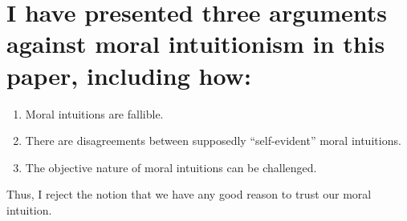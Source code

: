 \documentclass[12pt, a4paper, twoside]{article}
\begin{document}
\section{I have presented three arguments against moral intuitionism in this paper, including how: }

\begin{enumerate}
\item Moral intuitions are fallible.

\item There are disagreements between supposedly ``self-evident'' moral intuitions.

\item The objective nature of moral intuitions can be challenged.
\end{enumerate}

Thus, I reject the notion that we have any good reason to trust our moral intuition.

\printbibliography
\end{document}

